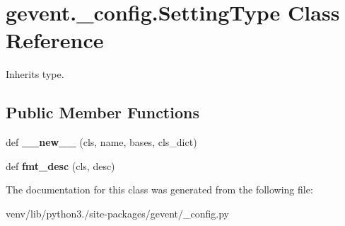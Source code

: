 \hypertarget{classgevent_1_1__config_1_1_setting_type}{}\section{gevent.\+\_\+config.\+Setting\+Type Class Reference}
\label{classgevent_1_1__config_1_1_setting_type}


Inherits type.

\subsection*{Public Member Functions}
\begin{DoxyCompactItemize}
\item 
\mbox{\label{classgevent_1_1__config_1_1_setting_type_a8edbc276ff366abc13b450fd37ce5e4c}} 
def {\bfseries \+\_\+\+\_\+new\+\_\+\+\_\+} (cls, name, bases, cls\+\_\+dict)
\item 
\mbox{\label{classgevent_1_1__config_1_1_setting_type_a0d74699d1e0b0df80018964d60758806}} 
def {\bfseries fmt\+\_\+desc} (cls, desc)
\end{DoxyCompactItemize}


The documentation for this class was generated from the following file\+:\begin{DoxyCompactItemize}
\item 
venv/lib/python3./site-\/packages/gevent/\+\_\+config.\+py\end{DoxyCompactItemize}
